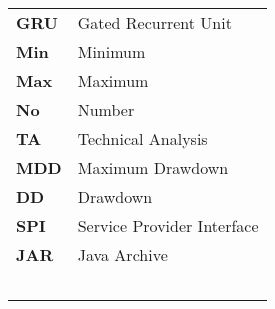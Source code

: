 \begin{tabularx}{\textwidth}{@{}lL{0.8\textwidth}@{}}
    \textbf{GRU}  & Gated Recurrent Unit                  \\
    \textbf{Min}  & Minimum                               \\
    \textbf{Max}  & Maximum                               \\
    \textbf{No}   & Number                                \\
    \textbf{TA}   & Technical Analysis                    \\
    \textbf{MDD}  & Maximum Drawdown                      \\
    \textbf{DD}   & Drawdown                              \\
    \textbf{SPI}  & Service Provider Interface            \\
    \textbf{JAR}  & Java Archive                          \\
    \textbf{}     &                                       \\
    \textbf{}     &                                       \\
    \textbf{}     &                                       \\
    \textbf{}     &                                       \\
    \textbf{}     &                                       \\
\end{tabularx}
